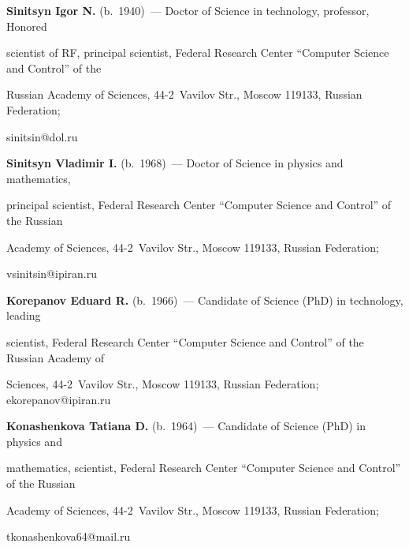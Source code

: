   


  \noindent


  \textbf{Sinitsyn Igor N.} (b.\ 1940)~--- Doctor of Science in technology, professor, Honored 


scientist of RF, principal scientist, Federal Research Center ``Computer Science and Control'' of the 


Russian Academy of Sciences, 44-2~Vavilov Str., Moscow 119133, Russian Federation; 


\mbox{sinitsin@dol.ru} 


  


  \vspace*{3pt}


 




  


  \noindent


  \textbf{Sinitsyn Vladimir I.} (b.\ 1968)~--- Doctor of Science in physics and mathematics, 


principal scientist, Federal Research Center ``Computer Science and Control'' of the Russian 


Academy of Sciences, 44-2~Vavilov Str., Moscow 119133, Russian Federation; 


\mbox{vsinitsin@ipiran.ru}


  


  \vspace*{3pt}


  


  \noindent


  \textbf{Korepanov Eduard R.} (b.\ 1966)~--- Candidate of Science (PhD) in technology, leading 


scientist, Federal Research Center ``Computer Science and Control'' of the Russian Academy of 


Sciences, 44-2~Vavilov Str., Moscow 119133, Russian Federation; \mbox{ekorepanov@ipiran.ru}


  


  


  \vspace*{3pt}


  


  \noindent


  \textbf{Konashenkova Tatiana D.} (b.\ 1964)~--- Candidate of Science (PhD) in physics and 


mathematics, scientist, Federal Research Center ``Computer Science and Control'' of the Russian 


Academy of Sciences, 44-2~Vavilov Str., Moscow 119133, Russian Federation; 


\mbox{tkonashenkova64@mail.ru}








\label{end\stat}





\renewcommand{\bibname}{\protect\rm Литература}





  


